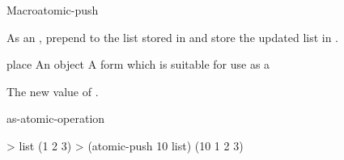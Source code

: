 \documentclass[10pt,twoside,english,pdftex]{article}
\begin{document}
\begin{functiondoc}{Macro}{atomic-push}{ \returns{}
    }
%

\fnsyntax

\fnpurpose As an , prepend  to the
list stored in  and store the updated list in
.

\fnpackage {}

\fnmodule {}

\fnargs
\begin{args}{place}
\arg[item] An object
\arg[place] A form which is suitable for use as a
\end{args}

\fnreturns The new value of . 

\begin{alsos}{as-atomic-operation}
\end{alsos}

\fnexample
\begin{example}
> list
(1 2 3)
> (atomic-push 10 list)
(10 1 2 3)
\end{example}

\end{functiondoc}

\end{document}
